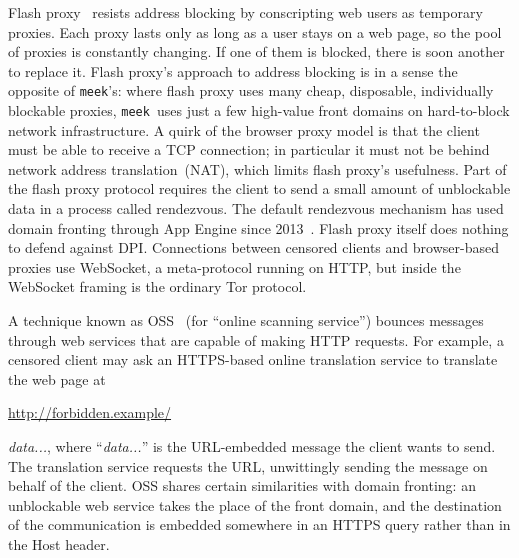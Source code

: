 \documentclass[conference]{IEEEtran}
\newcommand{\meek}{\texttt{meek}\xspace}
\def\urll#1{\begin{NoHyper}\url{#1}\end{NoHyper}}
\begin{document}
Flash proxy~\cite{flashproxy} resists address blocking by
conscripting web users as temporary proxies.
Each proxy lasts only as long as a
user stays on a web page, so the pool of proxies is constantly changing.
If one of them is blocked, there is soon another to replace it.
Flash proxy's approach to address blocking is in a sense
the opposite of \meek's:
where flash proxy uses many cheap, disposable, individually blockable proxies,
\meek\ uses just a few high-value front domains on hard-to-block network infrastructure.
A quirk of the browser proxy model is that
the client must be able to receive a TCP connection; in particular it
must not be behind network address translation~(NAT), which limits flash proxy's usefulness.
Part of the flash proxy protocol requires the client to send
a small amount of unblockable data in a process called rendezvous.
The default rendezvous mechanism has used domain fronting through App Engine since 2013~\cite{flashproxy-reg-appspot}.
Flash proxy itself does nothing to defend against DPI.
Connections between censored clients and browser-based proxies use
WebSocket, a meta-protocol running on HTTP,
but inside the WebSocket framing is the ordinary Tor protocol.

A technique known as OSS~\cite{oss} (for
``online scanning service'') bounces messages
through web services that are capable of making HTTP requests.
For example, a censored client may ask an HTTPS-based online translation service to
translate the web page at \urll{http://forbidden.example/}\textsl{data...},
where ``\textsl{data...}'' is the URL-embedded message the client wants to send.
The translation service requests the URL,
unwittingly sending the message on behalf of the client.
OSS shares certain similarities with domain fronting:
an unblockable web service takes the place of the front domain,
and the destination of the communication is embedded somewhere in an HTTPS query
rather than in the Host header.
\end{document}
